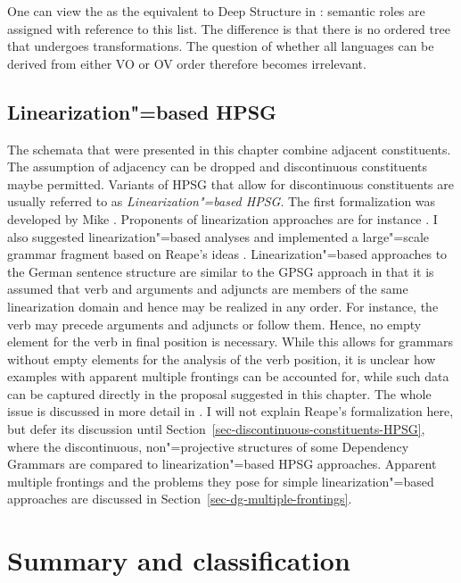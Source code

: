 \noindent
One can view the \argstl as the equivalent to Deep Structure in \gbt:
semantic roles are assigned with reference to this list. The difference is that there is no ordered tree
that undergoes transformations. The question of whether all languages can be derived from either VO or OV order
therefore becomes irrelevant. 

\subsection{Linearization"=based HPSG}
\label{sec-linearization-HPSG}

The schemata that were presented in this chapter combine adjacent constituents. The assumption of
adjacency can be dropped and discontinuous constituents maybe permitted. Variants of HPSG that allow
for discontinuous constituents are usually referred to as \emph{Linearization"=based HPSG}. The
first formalization was developed by Mike \citet{Reape91,Reape92a,Reape94a}. Proponents of linearization
approaches are for instance
\citet{Kathol95a,Kathol2000a,DS99a,RS99a,Crysmann2003c,BS2004a,Sato:06cluk,Wetta2011a}. I also
suggested linearization"=based analyses \citep{Mueller99a,Mueller2002b} and implemented a
large"=scale grammar fragment based on Reape's ideas \citep{Babel}. Linearization"=based approaches
to the German sentence structure are similar to the GPSG approach in that it is assumed that verb
and arguments and adjuncts are members of the same linearization domain and hence may be realized in
any order. For instance, the verb may precede arguments and adjuncts or follow them. Hence, no empty element for the verb in
final position is necessary. While this allows for grammars without empty elements for the analysis of the verb
position, it is unclear how examples with apparent multiple frontings can be accounted for, while
such data can be captured directly in the proposal suggested in this chapter. The
whole issue is discussed in more detail in . I will not explain Reape's
formalization here, but defer its discussion until Section~\ref{sec-discontinuous-constituents-HPSG}, where the discontinuous, non"=projective
structures of some Dependency Grammars are compared to linearization"=based HPSG
approaches. Apparent multiple frontings and the problems they pose for simple linearization"=based
approaches are discussed in Section~\ref{sec-dg-multiple-frontings}.


\section{Summary and classification}


